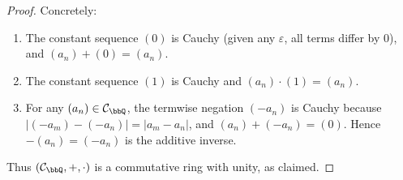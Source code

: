 \begin{proof}
    Concretely:
    \begin{enumerate}
        \item The constant sequence $(0)$ is Cauchy (given any $\varepsilon$, all terms differ by $0$), and $(a_n) + (0) = (a_n)$.
        \item The constant sequence $(1)$ is Cauchy and $(a_n) \cdot (1) = (a_n)$.
        \item For any $(a_n) \in \mathcal{C}_\bbQ$, the termwise negation $(-a_n)$ is Cauchy because $|(-a_m) - (-a_n)| = |a_m - a_n|$, and $(a_n) + (-a_n) = (0)$. Hence $-(a_n) = (-a_n)$ is the additive inverse.
    \end{enumerate}

    Thus $(\mathcal{C}_\bbQ, +, \cdot)$ is a commutative ring with unity, as claimed.
\end{proof}